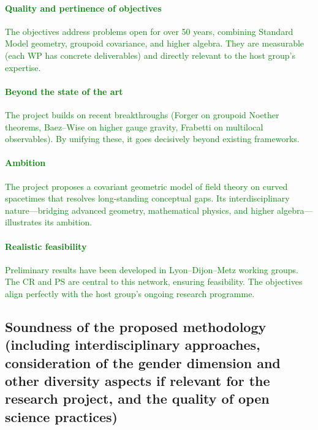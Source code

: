 \documentclass[11pt,draftproposal]{msca-pf}
\begin{document}
\paragraph{\textcolor{green}{Quality and pertinence of objectives}}  
\textcolor{green}{The objectives address problems open for over 50 years, combining Standard Model geometry, groupoid covariance, and higher algebra. They are measurable (each WP has concrete deliverables) and directly relevant to the host group’s expertise.}

\paragraph{\textcolor{green}{Beyond the state of the art}}  
\textcolor{green}{The project builds on recent breakthroughs (Forger on groupoid Noether theorems, Baez--Wise on higher gauge gravity, Frabetti on multilocal observables). By unifying these, it goes decisively beyond existing frameworks.}

\paragraph{\textcolor{green}{Ambition}}  
\textcolor{green}{The project proposes a covariant geometric model of field theory on curved spacetimes that resolves long-standing conceptual gaps. Its interdisciplinary nature---bridging advanced geometry, mathematical physics, and higher algebra---illustrates its ambition.}

\paragraph{\textcolor{green}{Realistic feasibility}}  
\textcolor{green}{Preliminary results have been developed in Lyon–Dijon–Metz working groups. The CR and PS are central to this network, ensuring feasibility. The objectives align perfectly with the host group’s ongoing research programme.}



\subsection{Soundness of the proposed methodology
    (including interdisciplinary approaches, consideration of the gender
    dimension and other diversity aspects if relevant for the research project,
    and the quality of open science practices) 
    }
\label{ssc:excellence: methodology}
\end{document}
